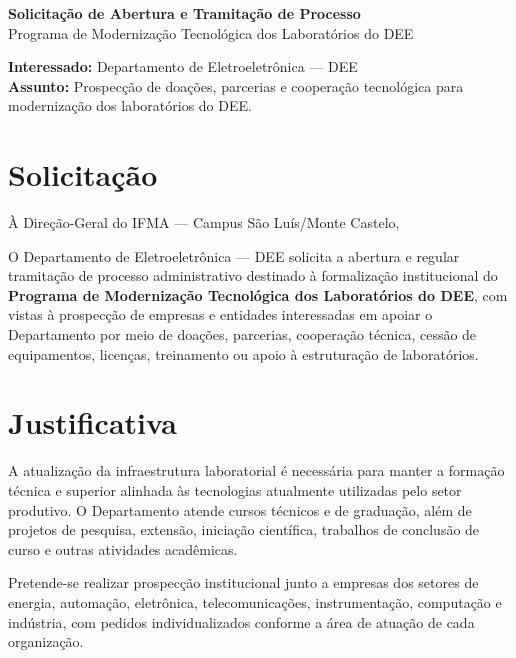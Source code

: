 \documentclass[12pt,a4paper]{article}
\begin{document}
\cabecalhoInstitucional

\begin{center}
{\Large\bfseries\color{azulpetroleo} Solicitação de Abertura e Tramitação de Processo}\\[2mm]
{\normalsize Programa de Modernização Tecnológica dos Laboratórios do DEE}
\end{center}

\noindent\textbf{Interessado:} Departamento de Eletroeletrônica — DEE\\
\textbf{Assunto:} Prospecção de doações, parcerias e cooperação tecnológica para modernização dos laboratórios do DEE.

\section{Solicitação}
À Direção-Geral do IFMA — Campus São Luís/Monte Castelo,

O Departamento de Eletroeletrônica — DEE solicita a abertura e regular tramitação de processo administrativo destinado à formalização institucional do \textbf{Programa de Modernização Tecnológica dos Laboratórios do DEE}, com vistas à prospecção de empresas e entidades interessadas em apoiar o Departamento por meio de doações, parcerias, cooperação técnica, cessão de equipamentos, licenças, treinamento ou apoio à estruturação de laboratórios.

\section{Justificativa}
A atualização da infraestrutura laboratorial é necessária para manter a formação técnica e superior alinhada às tecnologias atualmente utilizadas pelo setor produtivo. O Departamento atende cursos técnicos e de graduação, além de projetos de pesquisa, extensão, iniciação científica, trabalhos de conclusão de curso e outras atividades acadêmicas.

Pretende-se realizar prospecção institucional junto a empresas dos setores de energia, automação, eletrônica, telecomunicações, instrumentação, computação e indústria, com pedidos individualizados conforme a área de atuação de cada organização.
\end{document}
